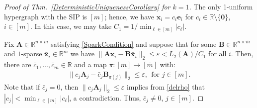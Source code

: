 \documentclass[9pt,twocolumn]{pnas-new}
\begin{document}
\begin{proof}[Proof of Thm.~\ref{DeterministicUniquenessCorollary} for $k=1$]
The only 1-uniform hypergraph with the SIP is $[m]$; hence, we have $\mathbf{x}_i = c_i \mathbf{e}_i$ for $c_i \in \mathbb{R} \setminus \{\mathbf{0}\}$, $i \in [m]$. In this case, we may take $C_1 = 1/ \min_{\ell \in [m]} |c_{\ell}|$. 

Fix $\mathbf{A} \in \mathbb{R}^{n \times m}$ satisfying \eqref{SparkCondition} and suppose that for some $\mathbf{B} \in \mathbb{R}^{n \times \bar m}$ and $1$-sparse $\mathbf{\bar x}_i \in \mathbb{R}^{\bar m}$ we have  $\|\mathbf{A}\mathbf{x}_i - \mathbf{B}\mathbf{\bar x}_i\|_2 \leq \varepsilon < L_2(\mathbf{A}) / C_1$ for all $i$. Then, there are $\bar{c}_1, \ldots, \bar{c}_m \in \mathbb{R}$ and a map $\pi: [m] \to [\bar m]$ with:
\begin{align}\label{1D}
\|c_j\mathbf{A}_j - \bar{c}_j\mathbf{B}_{\pi(j)}\|_2 \leq \varepsilon,\ \ \text{for $j \in [m]$}.
\end{align} 
Note that if $\bar{c}_j = 0$, then $\|c_j\mathbf{A}_j \|_2 \leq \varepsilon$ implies from \eqref{delrho} that $|c_j| < \min_{\ell \in [m]} | c_\ell |$, a contradiction.  Thus, $\bar{c}_j \neq 0$, $j \in [m]$.


\end{proof}
\end{document}
